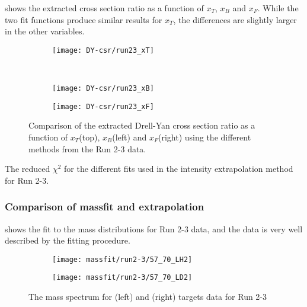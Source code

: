 \documentclass[../main.tex]{subfiles}
\begin{document}
 shows the extracted cross section ratio as a function of $x_T$, $x_B$ and $x_F$.
While the two fit functions produce similar results for $x_T$, the differences are slightly larger in
the other variables.

\begin{figure}[h!]
	\centering
	\begin{subfigure}{0.6\linewidth}
		\texttt{[image: DY-csr/run23\_xT]}
	\end{subfigure}\\
	\begin{subfigure}{0.45\linewidth}
		\texttt{[image: DY-csr/run23\_xB]}
	\end{subfigure}
	\begin{subfigure}{0.45\linewidth}
		\texttt{[image: DY-csr/run23\_xF]}
	\end{subfigure}
	\caption{Comparison of the extracted Drell-Yan cross section ratio as a function of $x_T$(top),
		$x_B$(left) and $x_F$(right) using the different methods from the Run 2-3
		data.}
	\label{fig:CSR_Run2-3}
\end{figure}

\begin{table}[h!]
	\centering
	\caption{The reduced $\chi^2$ for the different fits used in the intensity extrapolation method for Run 2-3. }
	\label{tab:chi_run23}
	
\end{table}


\subsubsection{Comparison of massfit and extrapolation}
 shows the fit to the mass distributions for Run 2-3 data, and the
data is very well described by the fitting procedure.
\begin{figure}[h!]
	\begin{subfigure}{0.45\linewidth}
		\texttt{[image: massfit/run2-3/57\_70\_LH2]}
	\end{subfigure}
	\begin{subfigure}{0.45\linewidth}
		\texttt{[image: massfit/run2-3/57\_70\_LD2]}
	\end{subfigure}
	\caption{The mass spectrum for (left) and (right) targets data for Run 2-3}
	\label{fig:massfit_integrated_run23}
\end{figure}
\end{document}
